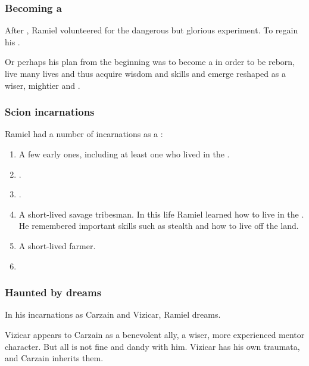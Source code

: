 \subsubsection{Becoming a \malach}
After , Ramiel volunteered for the dangerous but glorious \Malach{} experiment. 
To regain his \honour. 

Or perhaps his plan from the beginning was to become a \malach{} in order to be reborn, live many lives and thus acquire wisdom and skills and emerge reshaped as a wiser, mightier \resphan{} and \vertex. 





\subsubsection{Scion incarnations}
Ramiel had a number of incarnations as a \malach: 

\begin{enumerate}
  \item 
    A few early ones, including at least one who lived in the \VaimonCaliphate. 
  \item 
    .
  \item 
    .
  \item 
    A short-lived savage tribesman.
    In this life Ramiel learned how to live in the \wylde. 
    He remembered important skills such as stealth and how to live off the land.
  \item 
    A short-lived farmer. 
  \item 
\end{enumerate}






\subsubsection{Haunted by dreams}
In his incarnations as Carzain and Vizicar, Ramiel dreams. 

Vizicar appears to Carzain as a benevolent ally, a wiser, more experienced mentor character. But all is not fine and dandy with him. Vizicar has his own traumata, and Carzain inherits them. 

